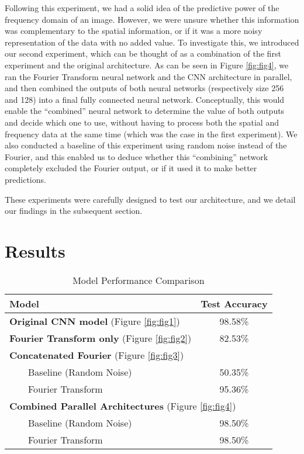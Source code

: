 Following this experiment, we had a solid idea of the predictive power of the frequency domain of an image. However, we were unsure whether this information was complementary to the spatial information, or if it was a more noisy representation of the data with no added value. To investigate this, we introduced our second experiment, which can be thought of as a combination of the first experiment and the original architecture. As can be seen in Figure \ref{fig:fig4}, we ran the Fourier Transform neural network and the CNN architecture in parallel, and then combined the outputs of both neural networks (respectively size 256 and 128) into a final fully connected neural network. Conceptually, this would enable the “combined” neural network to determine the value of both outputs and decide which one to use, without having to process both the spatial and frequency data at the same time (which was the case in the first experiment). We also conducted a baseline of this experiment using random noise instead of the Fourier, and this enabled us to deduce whether this “combining” network completely excluded the Fourier output, or if it used it to make better predictions.

These experiments were carefully designed to test our architecture, and we detail our findings in the subsequent section.


\section{Results}

\begin{table}[h]
    \centering
    \begin{tabular}{|l|c|}
    \hline
    \textbf{Model} & \textbf{Test Accuracy} \\
    \hline
    \textbf{Original CNN model} (Figure \ref{fig:fig1}) & 98.58\% \\
    \hline
    \textbf{Fourier Transform only} (Figure \ref{fig:fig2}) & 82.53\% \\
    \hline
    \multicolumn{2}{|l|}{\textbf{Concatenated Fourier} (Figure \ref{fig:fig3})} \\
    \hline
    ~~~~Baseline (Random Noise) & 50.35\% \\
    ~~~~Fourier Transform & 95.36\% \\
    \hline
    \multicolumn{2}{|l|}{\textbf{Combined Parallel Architectures} (Figure \ref{fig:fig4})} \\
    \hline
    ~~~~Baseline (Random Noise) & 98.50\% \\
    ~~~~Fourier Transform & 98.50\% \\
    \hline
    \end{tabular}
    \caption{Model Performance Comparison}
    \label{tab:model-comparison}
\end{table}

